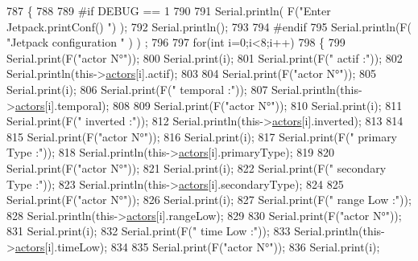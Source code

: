 \begin{DoxyCode}
787 \{
788 
789 \textcolor{preprocessor}{#if DEBUG == 1 }
790 
791     Serial.println( F(\textcolor{stringliteral}{"Enter Jetpack.printConf() "}) );
792     Serial.println();
793 
794 \textcolor{preprocessor}{#endif }
795     Serial.println(F( \textcolor{stringliteral}{"Jetpack configuration "} ) ) ;
796  
797         \textcolor{keywordflow}{for}(\textcolor{keywordtype}{int} i=0;i<8;i++)
798     \{   
799         Serial.print(F(\textcolor{stringliteral}{"actor N°"}));
800         Serial.print(i);
801         Serial.print(F(\textcolor{stringliteral}{" actif :"}));
802         Serial.println(this->\hyperlink{class_jetpack_a7e16d2f97837f9712a2e6de1c50d99db}{actors}[i].actif);
803         
804         Serial.print(F(\textcolor{stringliteral}{"actor N°"}));
805         Serial.print(i);
806         Serial.print(F(\textcolor{stringliteral}{" temporal :"}));
807         Serial.println(this->\hyperlink{class_jetpack_a7e16d2f97837f9712a2e6de1c50d99db}{actors}[i].temporal);
808 
809         Serial.print(F(\textcolor{stringliteral}{"actor N°"}));
810         Serial.print(i);
811         Serial.print(F(\textcolor{stringliteral}{" inverted :"}));
812         Serial.println(this->\hyperlink{class_jetpack_a7e16d2f97837f9712a2e6de1c50d99db}{actors}[i].inverted);
813 
814 
815         Serial.print(F(\textcolor{stringliteral}{"actor N°"}));
816         Serial.print(i);
817         Serial.print(F(\textcolor{stringliteral}{" primary Type :"}));
818         Serial.println(this->\hyperlink{class_jetpack_a7e16d2f97837f9712a2e6de1c50d99db}{actors}[i].primaryType);
819 
820         Serial.print(F(\textcolor{stringliteral}{"actor N°"}));
821         Serial.print(i);
822         Serial.print(F(\textcolor{stringliteral}{" secondary Type :"}));       
823         Serial.println(this->\hyperlink{class_jetpack_a7e16d2f97837f9712a2e6de1c50d99db}{actors}[i].secondaryType);
824 
825         Serial.print(F(\textcolor{stringliteral}{"actor N°"}));
826         Serial.print(i);
827         Serial.print(F(\textcolor{stringliteral}{" range Low :"}));
828         Serial.println(this->\hyperlink{class_jetpack_a7e16d2f97837f9712a2e6de1c50d99db}{actors}[i].rangeLow);
829 
830         Serial.print(F(\textcolor{stringliteral}{"actor N°"}));
831         Serial.print(i);
832         Serial.print(F(\textcolor{stringliteral}{" time Low :"}));
833         Serial.println(this->\hyperlink{class_jetpack_a7e16d2f97837f9712a2e6de1c50d99db}{actors}[i].timeLow);
834 
835         Serial.print(F(\textcolor{stringliteral}{"actor N°"}));
836         Serial.print(i);

\end{DoxyCode}
